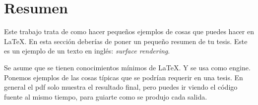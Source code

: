 \chapter*{Resumen}
Este trabajo trata de como hacer pequeños ejemplos de cosas que puedes hacer en \LaTeX{}.
En esta sección deberías de poner un pequeño resumen de tu tesis.
Este es un ejemplo de un texto en inglés: \textenglish{\emph{surface rendering}}.

Se asume que se tienen conocimientos mínimos de \LaTeX{}.
Y se usa  como engine.
Ponemos ejemplos de las cosas típicas que se podrían requerir en una tesis.
En general el pdf solo muestra el resultado final, pero puedes ir viendo el código fuente al mismo tiempo, para guiarte como se produjo cada salida.

